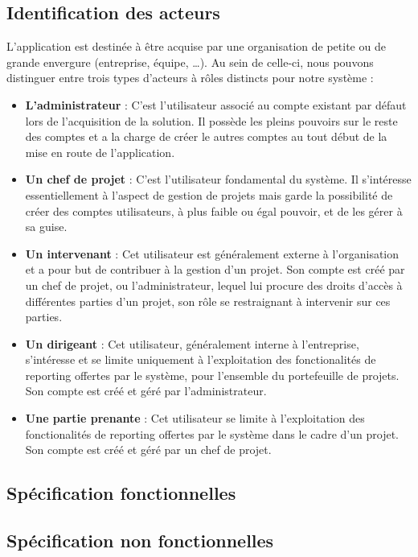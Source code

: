 \begin{spacing}{1.5}
\subsection{Identification des acteurs}
L’application est destinée à être acquise par une organisation de petite ou de grande envergure (entreprise, équipe, …). Au sein de celle-ci, nous pouvons distinguer entre trois types d'acteurs à rôles distincts pour notre système :
\begin{itemize}
    \item \textbf{L'administrateur} : C’est l'utilisateur associé au compte existant par défaut lors de l'acquisition de la solution. Il possède les pleins pouvoirs sur le reste des comptes et a la charge de créer le autres comptes au tout début de la mise en route de l'application.
    \item \textbf{Un chef de projet} : C’est l'utilisateur fondamental du système. Il s'intéresse essentiellement à l'aspect de gestion de projets mais garde la possibilité de créer des comptes utilisateurs, à plus faible ou égal pouvoir, et de les gérer à sa guise.
    \item \textbf{Un intervenant} : Cet utilisateur est généralement externe à l'organisation et a pour but de contribuer à la gestion d'un projet. Son compte est créé par un chef de projet, ou l'administrateur, lequel lui procure des droits d'accès à différentes parties d'un projet, son rôle se restraignant à intervenir sur ces parties.
    \item \textbf{Un dirigeant} : Cet utilisateur, généralement interne à l'entreprise, s'intéresse et se limite uniquement à l'exploitation des fonctionalités de reporting offertes par le système, pour l'ensemble du portefeuille de projets. Son compte est créé et géré par l'administrateur.
    \item \textbf{Une partie prenante} : Cet utilisateur se limite à l'exploitation des fonctionalités de reporting offertes par le système dans le cadre d'un projet. Son compte est créé et géré par un chef de projet.
\end{itemize}

\subsection{Spécification fonctionnelles}

\subsection{Spécification non fonctionnelles}



\end{spacing}
